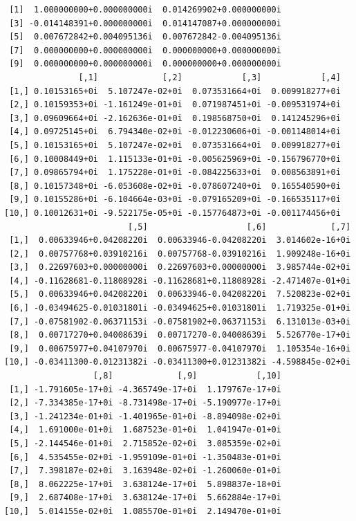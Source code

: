 \documentclass[11pt]{article}
\begin{document}
\begin{verbatim}
 [1]  1.000000000+0.000000000i  0.014269902+0.000000000i
 [3] -0.014148391+0.000000000i  0.014147087+0.000000000i
 [5]  0.007672842+0.004095136i  0.007672842-0.004095136i
 [7]  0.000000000+0.000000000i  0.000000000+0.000000000i
 [9]  0.000000000+0.000000000i  0.000000000+0.000000000i
               [,1]             [,2]            [,3]            [,4]
 [1,] 0.10153165+0i  5.107247e-02+0i  0.073531664+0i  0.009918277+0i
 [2,] 0.10159353+0i -1.161249e-01+0i  0.071987451+0i -0.009531974+0i
 [3,] 0.09609664+0i -2.162636e-01+0i  0.198568750+0i  0.141245296+0i
 [4,] 0.09725145+0i  6.794340e-02+0i -0.012230606+0i -0.001148014+0i
 [5,] 0.10153165+0i  5.107247e-02+0i  0.073531664+0i  0.009918277+0i
 [6,] 0.10008449+0i  1.115133e-01+0i -0.005625969+0i -0.156796770+0i
 [7,] 0.09865794+0i  1.175228e-01+0i -0.084225633+0i  0.008563891+0i
 [8,] 0.10157348+0i -6.053608e-02+0i -0.078607240+0i  0.165540590+0i
 [9,] 0.10155286+0i -6.104664e-03+0i -0.079165209+0i -0.166535117+0i
[10,] 0.10012631+0i -9.522175e-05+0i -0.157764873+0i -0.001174456+0i
                         [,5]                    [,6]             [,7]
 [1,]  0.00633946+0.04208220i  0.00633946-0.04208220i  3.014602e-16+0i
 [2,]  0.00757768+0.03910216i  0.00757768-0.03910216i  1.909248e-16+0i
 [3,]  0.22697603+0.00000000i  0.22697603+0.00000000i  3.985744e-02+0i
 [4,] -0.11628681-0.11808928i -0.11628681+0.11808928i -2.471407e-01+0i
 [5,]  0.00633946+0.04208220i  0.00633946-0.04208220i  7.520823e-02+0i
 [6,] -0.03494625-0.01031801i -0.03494625+0.01031801i  1.719325e-01+0i
 [7,] -0.07581902-0.06371153i -0.07581902+0.06371153i  6.131013e-03+0i
 [8,]  0.00717270+0.04008639i  0.00717270-0.04008639i  5.526770e-17+0i
 [9,]  0.00675977+0.04107970i  0.00675977-0.04107970i  1.105354e-16+0i
[10,] -0.03411300-0.01231382i -0.03411300+0.01231382i -4.598845e-02+0i
                  [,8]             [,9]            [,10]
 [1,] -1.791605e-17+0i -4.365749e-17+0i  1.179767e-17+0i
 [2,] -7.334385e-17+0i -8.731498e-17+0i -5.190977e-17+0i
 [3,] -1.241234e-01+0i -1.401965e-01+0i -8.894098e-02+0i
 [4,]  1.691000e-01+0i  1.687523e-01+0i  1.041947e-01+0i
 [5,] -2.144546e-01+0i  2.715852e-02+0i  3.085359e-02+0i
 [6,]  4.535455e-02+0i -1.959109e-01+0i -1.350483e-01+0i
 [7,]  7.398187e-02+0i  3.163948e-02+0i -1.260060e-01+0i
 [8,]  8.062225e-17+0i  3.638124e-17+0i  5.898837e-18+0i
 [9,]  2.687408e-17+0i  3.638124e-17+0i  5.662884e-17+0i
[10,]  5.014155e-02+0i  1.085570e-01+0i  2.149470e-01+0i
\end{verbatim}
\end{document}
